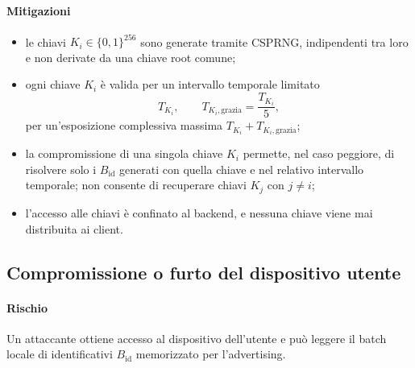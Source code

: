 \documentclass[a4paper,11pt]{article}
\begin{document}
\paragraph{Mitigazioni}
\begin{itemize}
  \item le chiavi \(K_i \in \{0,1\}^{256}\) sono generate tramite CSPRNG, indipendenti tra loro e
        non derivate da una chiave root comune;
  \item ogni chiave \(K_i\) è valida per un intervallo temporale limitato
        \[
          T_{K_i},
          \qquad
          T_{K_i,\mathrm{grazia}} = \frac{T_{K_i}}{5},
        \]
        per un’esposizione complessiva massima \(T_{K_i} + T_{K_i,\mathrm{grazia}}\);
  \item la compromissione di una singola chiave \(K_i\) permette, nel caso peggiore, di risolvere
        solo i \(B_{\text{id}}\) generati con quella chiave e nel relativo intervallo temporale;
        non consente di recuperare chiavi \(K_j\) con \(j \neq i\);
  \item l’accesso alle chiavi è confinato al backend, e nessuna chiave viene mai distribuita ai client.
\end{itemize}

\subsection{Compromissione o furto del dispositivo utente}
\paragraph{Rischio}
Un attaccante ottiene accesso al dispositivo dell’utente e può leggere il batch locale di
identificativi \(B_{\text{id}}\) memorizzato per l’advertising.
\end{document}
